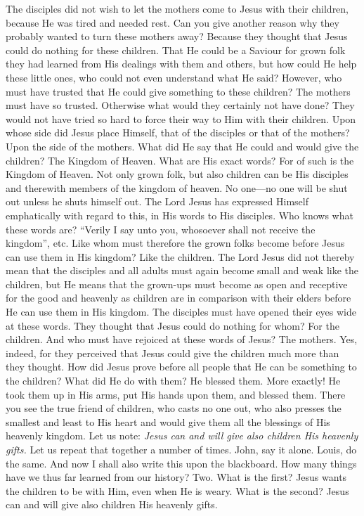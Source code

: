 The disciples did not wish to let the mothers come to Jesus with their children, because He was tired and needed rest. Can you give
another reason why they probably wanted to turn these mothers away? Because they thought that Jesus could do nothing for these children. That He could be a Saviour for grown folk they had learned from His dealings with them and others, but how could He help these little ones, who could not even understand what He said? However, who must have trusted that He could give something to these children? The mothers must have so trusted. Otherwise what would they certainly not have done? They would not have tried so hard to force their way to Him with their children. Upon whose side did Jesus place Himself, that of the disciples or that of the mothers? Upon the side of the mothers. What did He say that He could and would give the children? The Kingdom of Heaven. What are His exact words? For of such is the Kingdom of Heaven. Not only grown folk, but also children can be His disciples and therewith members of the kingdom of heaven. No one—no one will be shut out unless he shuts himself out. The Lord Jesus has expressed Himself emphatically with regard to this, in His words to His disciples. Who knows what these words are? “Verily I say unto you, whosoever shall not receive the kingdom”, etc. Like whom must therefore the grown folks become before Jesus can use them in His kingdom? Like the children. The Lord Jesus did not thereby mean that the disciples and all adults must again become small and weak like the children, but He means that the grown-ups must become as open and receptive for the good and heavenly as children are in comparison with their elders before He can use them in His kingdom. The disciples must have opened their eyes wide at these words. They thought that Jesus could do nothing for whom? For the children. And who must have rejoiced at these words of Jesus? The mothers. Yes, indeed, for they perceived that Jesus could give the children much more than they thought. How did Jesus prove before all people that He can be something to the children? What did He do with them? He blessed them. More exactly! He took them up in His arms, put His hands upon them, and blessed them. There you see the true friend of children, who casts no one out, who also presses the smallest and least to His heart and would give them all the blessings of His heavenly kingdom. Let us note: \emph{Jesus can and will give also children His heavenly gifts.} Let us repeat that together a number of times. John, say it alone. Louis, do the same. And now I shall also write this upon the blackboard. How many things have we thus far learned from our history? Two. What is the first? Jesus
wants the children to be with Him, even when He is weary. What is the second? Jesus can and will give also children His heavenly gifts.

